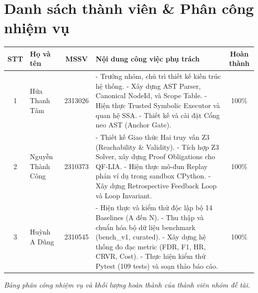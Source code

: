 \chapter*{Danh sách thành viên \& Phân công nhiệm vụ}

\vspace{5pt}
\noindent
\begin{center}
\renewcommand{\arraystretch}{1.2}
\begin{tabular}{|c|l|c|p{7.4cm}|c|}
\hline
\textbf{STT} & \textbf{Họ và tên} & \textbf{MSSV} & \textbf{Nội dung công việc phụ trách} & \textbf{Hoàn thành} \\
\hline 
1 & Hứa Thanh Tâm & 2313026 & 
- Trưởng nhóm, chủ trì thiết kế kiến trúc hệ thống.\newline
- Xây dựng AST Parser, Canonical NodeId, và Scope Table.\newline
- Hiện thực Trusted Symbolic Executor và quan hệ SSA.\newline
- Thiết kế và cài đặt Cổng neo AST (Anchor Gate). & 100\% \\
\hline 
2 & Nguyễn Thành Công & 2310373 & 
- Thiết kế Giao thức Hai truy vấn Z3 (Reachability \& Validity).\newline
- Tích hợp Z3 Solver, xây dựng Proof Obligations cho QF-LIA.\newline
- Hiện thực mô-đun Replay phản ví dụ trong sandbox CPython.\newline
- Xây dựng Retrospective Feedback Loop và Loop Invariant. & 100\% \\
\hline 
3 & Huỳnh A Dũng & 2310545 & 
- Hiện thực và kiểm thử độc lập bộ 14 Baselines (A đến N).\newline
- Thu thập và chuẩn hóa bộ dữ liệu benchmark (bench\_v1, curated).\newline
- Xây dựng hệ thống đo đạc metric (FDR, F1, HR, CRVR, Cost).\newline
- Thực hiện kiểm thử Pytest (109 tests) và soạn thảo báo cáo. & 100\% \\
\hline
\end{tabular}
\end{center}
\vspace{10pt}
\noindent\textit{Bảng phân công nhiệm vụ và khối lượng hoàn thành của thành viên nhóm đề tài.}
